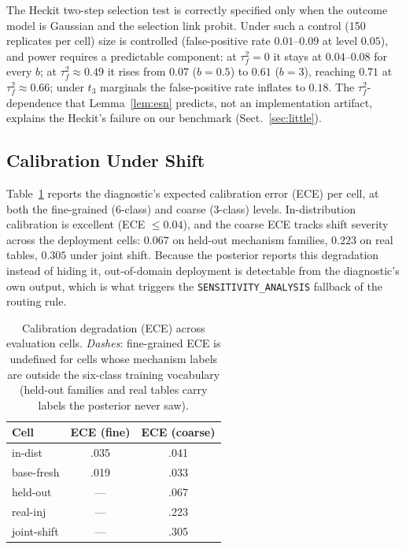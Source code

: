 \documentclass[conference]{IEEEtran}
\begin{document}
The Heckit two-step selection test is correctly specified only when the outcome model is
Gaussian and the selection link probit. Under such a control (150 replicates per cell) size
is controlled (false-positive rate $0.01$--$0.09$ at level $0.05$), and power requires a
predictable component: at $\tau_f^2=0$ it stays at $0.04$--$0.08$ for every $b$; at
$\tau_f^2\approx0.49$ it rises from $0.07$ ($b{=}0.5$) to $0.61$ ($b{=}3$), reaching
$0.71$ at $\tau_f^2\approx0.66$; under $t_3$ marginals the false-positive rate inflates to
$0.18$. The $\tau_f^2$-dependence that Lemma~\ref{lem:esn} predicts, not an implementation
artifact, explains the Heckit's failure on our benchmark (Sect.~\ref{sec:little}).

\subsection{Calibration Under Shift}

Table~\ref{tab:calib_deg} reports the
diagnostic's expected calibration error (ECE) per cell, at both the fine-grained
(6-class) and coarse (3-class) levels. In-distribution calibration is excellent
(ECE $\le0.04$), and the coarse ECE tracks shift severity across the deployment cells:
$0.067$ on held-out mechanism families, $0.223$ on real tables, $0.305$ under joint
shift. Because the posterior reports this degradation instead of hiding it, out-of-domain
deployment is detectable from the diagnostic's own output, which is what triggers the
\texttt{SENSITIVITY\_ANALYSIS} fallback of the routing rule.

\begin{table}[t]
\caption{Calibration degradation (ECE) across evaluation cells. \emph{Dashes}: fine-grained
ECE is undefined for cells whose mechanism labels are outside the six-class training
vocabulary (held-out families and real tables carry labels the posterior never saw).}\label{tab:calib_deg}
\centering\small
\begin{tabular}{lcc}
\toprule
Cell & ECE (fine) & ECE (coarse) \\
\midrule
in-dist & .035 & .041 \\
base-fresh & .019 & .033 \\
held-out & --- & .067 \\
real-inj & --- & .223 \\
joint-shift & --- & .305 \\
\bottomrule
\end{tabular}
\end{table}
\end{document}
